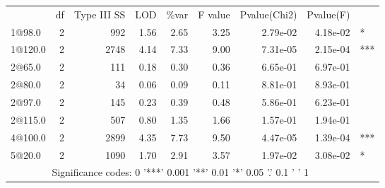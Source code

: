 \documentclass[a4paper,11pt]{article}\usepackage[]{graphicx}\usepackage[]{color}
\begin{document}
\begin{table}[ht]
\begin{flushleft}
\begin{tabular}{lrrrrrrrl}
  & df & Type III SS & LOD & \%var & F value & Pvalue(Chi2) & Pvalue(F) &  \\ 
 1@98.0 & 2 & 992 & 1.56 & 2.65 & 3.25 & 2.79e-02 & 4.18e-02 & * \\ 
  1@120.0 & 2 & 2748 & 4.14 & 7.33 & 9.00 & 7.31e-05 & 2.15e-04 & *** \\ 
  2@65.0 & 2 & 111 & 0.18 & 0.30 & 0.36 & 6.65e-01 & 6.97e-01 &   \\ 
  2@80.0 & 2 & 34 & 0.06 & 0.09 & 0.11 & 8.81e-01 & 8.93e-01 &   \\ 
  2@97.0 & 2 & 145 & 0.23 & 0.39 & 0.48 & 5.86e-01 & 6.23e-01 &   \\ 
  2@115.0 & 2 & 507 & 0.80 & 1.35 & 1.66 & 1.57e-01 & 1.94e-01 &   \\ 
  4@100.0 & 2 & 2899 & 4.35 & 7.73 & 9.50 & 4.47e-05 & 1.39e-04 & *** \\ 
  5@20.0 & 2 & 1090 & 1.70 & 2.91 & 3.57 & 1.97e-02 & 3.08e-02 & * \\ 
   \hline  \multicolumn{8}{c}{Significance codes:  0 '***' 0.001 '**' 0.01 '*' 0.05 '.' 0.1 ' ' 1} \\\end{tabular}
\label{anova}
\end{flushleft}
\end{table}


\end{document}
